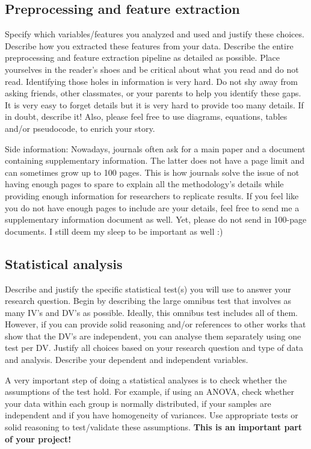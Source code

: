 \documentclass[10pt,a4paper]{article}
\begin{document}
\subsection{Preprocessing and feature extraction}
Specify which variables/features you analyzed and used and justify these choices. Describe how you extracted these features from your data. Describe the entire preprocessing and feature extraction pipeline as detailed as possible. Place yourselves in the reader's shoes and be critical about what you read and do not read. Identifying those holes in information is very hard. Do not shy away from asking friends, other classmates, or your parents to help you identify these gaps. It is very easy to forget details but it is very hard to provide too many details. If in doubt, describe it! Also, please feel free to use diagrams, equations, tables and/or pseudocode, to enrich your story. 

Side information: Nowadays, journals often ask for a main paper and a document containing supplementary information. The latter does not have a page limit and can sometimes grow up to 100 pages. This is how journals solve the issue of not having enough pages to spare to explain all the methodology's details while providing enough information for researchers to replicate results. If you feel like you do not have enough pages to include are your details, feel free to send me a supplementary information document as well. Yet, please do not send in 100-page documents. I still deem my sleep to be important as well :)

\subsection{Statistical analysis}
Describe and justify the specific statistical test(s) you will use to answer your research question. Begin by describing the large omnibus test that involves as many IV's and DV's as possible. Ideally, this omnibus test includes all of them. However, if you can provide solid reasoning and/or references to other works that show that the DV's are independent, you can analyse them separately using one test per DV. Justify all choices based on your research question and type of data and analysis. Describe your dependent and independent variables. 

A very important step of doing a statistical analyses is to check whether the assumptions of the test hold. For example, if using an ANOVA, check whether your data within each group is normally distributed, if your samples are independent and if you have homogeneity of variances. Use appropriate tests or solid reasoning to test/validate these assumptions. \textbf{This is an important part of your project!}
\end{document}
